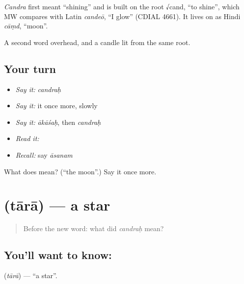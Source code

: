 \begin{cousinweb}
\emph{Candra} first meant \textquotedblleft{}shining\textquotedblright{} and is built on the root √cand, \textquotedblleft{}to shine\textquotedblright{}, which MW compares with Latin \emph{candeō}, \textquotedblleft{}I glow\textquotedblright{} (CDIAL 4661). It lives on as Hindi \emph{cāṃd}, \textquotedblleft{}moon\textquotedblright{}.
\end{cousinweb}

\begin{grammarlens}[title={What you've built}]
A second word overhead, and a candle lit from the same root.
\end{grammarlens}

\subsection*{Your turn}
\begin{itemize}
\raggedright
  \item \emph{Say it:} \emph{candraḥ}
  \item \emph{Say it:} it once more, slowly
  \item \emph{Say it:} \emph{ākāśaḥ}, then \emph{candraḥ}
  \item \emph{Read it:} \textbf{}
  \item \emph{Recall:} say \emph{āsanam}
\end{itemize}

\begin{tcolorbox}[breakable,colback=teal!4,colframe=teal!35!black,title={Before you move on}]
What does  mean? (\textquotedblleft{}the moon\textquotedblright{}.) Say it once more.
\end{tcolorbox}
\section[\texorpdfstring{\sk{तारा} (tārā)}{तारा (tārā)}]{ (tārā) — a star}

\label{lesson:SA-C31-star}



\begin{quote}
Before the new word: what did \emph{candraḥ} mean?
\end{quote}

\subsection*{You'll want to know: }
\textbf{} (\emph{tārā}) — \textquotedblleft{}a star\textquotedblright{}.

